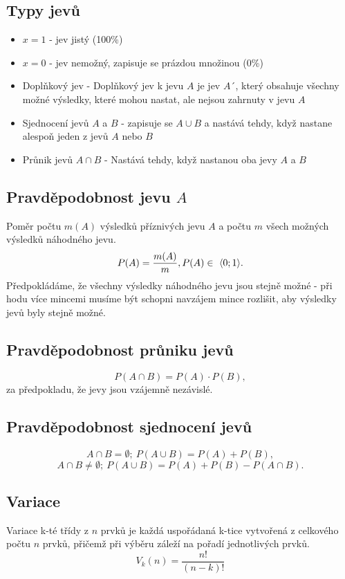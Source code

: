     \subsection{Typy jevů}
    \begin{itemize}
            \item $x=1$ - jev jistý (100\%)
            \item $x=0$ - jev nemožný, zapisuje se prázdou množinou (0\%)
            \item Doplňkový jev - Doplňkový jev k jevu $A$ je jev $A$´, který obsahuje všechny možné výsledky, které mohou nastat, ale nejsou zahrnuty v jevu $A$
            \item Sjednocení jevů $A$ a $B$ - zapisuje se $A\cup B$ a nastává tehdy, když nastane alespoň jeden z jevů $A$ nebo $B$
            \item Průnik jevů $A\cap B$ - Nastává tehdy, když nastanou oba jevy $A$ a $B$
        \end{itemize}
    \subsection{Pravděpodobnost jevu $A$}
    Poměr počtu $m(A)$ výsledků příznivých jevu $A$ a počtu $m$ všech možných výsledků náhodného jevu.\\
    $$
    P(A)=\frac{m(A)}{m},\space\space P(A) \in \ \langle0;1\rangle.
    $$
    Předpokládáme, že všechny výsledky náhodného jevu jsou stejně možné - při hodu více mincemi musíme být schopni navzájem mince rozlišit, aby výsledky jevů byly stejně možné.
    \subsection{Pravděpodobnost průniku jevů}
    $$
    P(A\cap B) = P(A) \cdot P(B),
    $$ 
    za předpokladu, že jevy jsou vzájemně nezávislé.
    \subsection{Pravděpodobnost sjednocení jevů}
    $$
    A \cap B=\emptyset; \  P(A\cup B)=P(A)+P(B),
    $$
    $$
    A \cap B\neq\emptyset; \  P(A\cup B)=P(A)+P(B)-P(A\cap B).
    $$
    \subsection{Variace}
    Variace k-té třídy z $n$ prvků je každá uspořádaná k-tice vytvořená z celkového počtu $n$ prvků, přičemž při výběru záleží na pořadí jednotlivých prvků.\\
    $$
    V_k (n)=\frac{n!}{(n-k)!}
    $$
